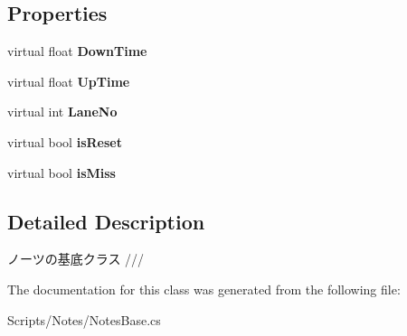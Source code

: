 \subsection*{Properties}
\begin{DoxyCompactItemize}
\item 
virtual float {\bfseries Down\+Time}\hypertarget{class_notes_base_ac6ddbe1bd315a27b931e43931a4b775f}{}\label{class_notes_base_ac6ddbe1bd315a27b931e43931a4b775f}

\item 
virtual float {\bfseries Up\+Time}\hypertarget{class_notes_base_ad9f83b6974007661236f97879e9dbe2d}{}\label{class_notes_base_ad9f83b6974007661236f97879e9dbe2d}

\item 
virtual int {\bfseries Lane\+No}\hypertarget{class_notes_base_a534e0bad053455b72e66c3790d962967}{}\label{class_notes_base_a534e0bad053455b72e66c3790d962967}

\item 
virtual bool {\bfseries is\+Reset}\hypertarget{class_notes_base_a34bcb4f83f517f356b3dd98e561d192e}{}\label{class_notes_base_a34bcb4f83f517f356b3dd98e561d192e}

\item 
virtual bool {\bfseries is\+Miss}\hypertarget{class_notes_base_aed65e64d481dc8caf7b8d21c342e9639}{}\label{class_notes_base_aed65e64d481dc8caf7b8d21c342e9639}

\end{DoxyCompactItemize}


\subsection{Detailed Description}
ノーツの基底クラス /// 



The documentation for this class was generated from the following file\+:\begin{DoxyCompactItemize}
\item 
Scripts/\+Notes/Notes\+Base.\+cs\end{DoxyCompactItemize}
